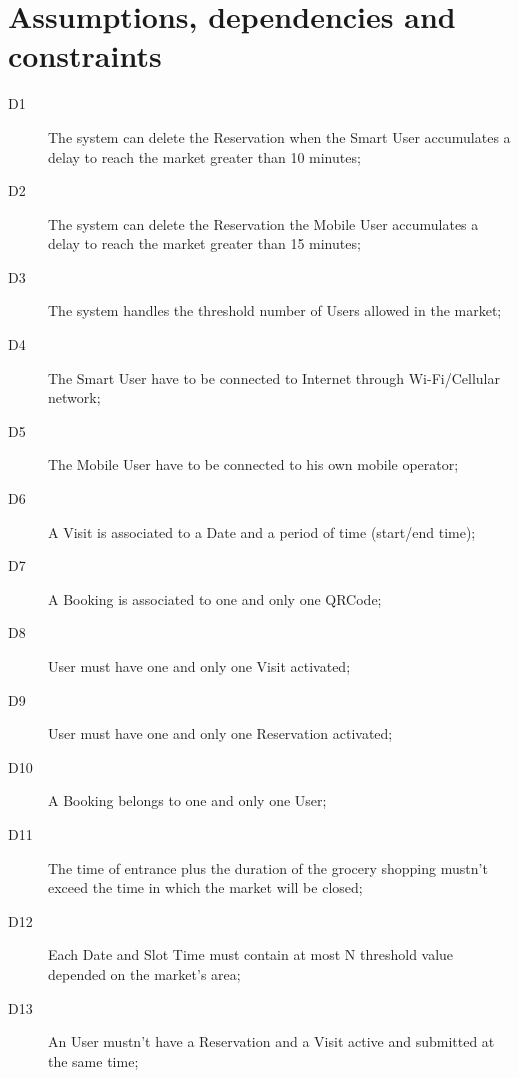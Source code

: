 \section{Assumptions, dependencies and constraints}
\begin{description}
    \item[D1] The system can delete the Reservation when the Smart User accumulates a delay to reach the market greater than 10 minutes; 
    \item[D2] The system can delete the Reservation the Mobile User accumulates a delay to reach the market greater than 15 minutes; 
    \item[D3] The system handles the threshold number of Users allowed in the market;
    \item[D4] The Smart User have to be connected to Internet through Wi-Fi/Cellular network;
    \item[D5] The Mobile User have to be connected to his own mobile operator;
    \item[D6] A Visit is associated to a Date and a period of time (start/end time);
    \item[D7] A Booking is associated to one and only one QRCode;
    \item[D8] User must have one and only one Visit activated;
    \item[D9] User must have one and only one Reservation activated;
    \item[D10] A Booking belongs to one and only one User;
    \item[D11] The time  of entrance plus the duration of the grocery shopping mustn’t exceed the time in which the market will be closed; 
    \item[D12] Each Date and Slot Time must contain at most N threshold value depended on the market's area;
    \item[D13] An User mustn’t have a Reservation and a Visit active and submitted at the same time;
\end{description}

